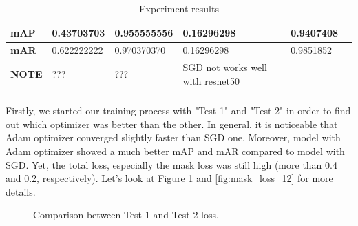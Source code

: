 \begin{longtable}[c]{|p{}|p{}|p{}|p{}|p{}|p{}|}
		\textbf{mAP} & 0.43703703 & 0.955555556 & 0.16296298 & 0.9407408 &  \\ \hline
		\textbf{mAR} & 0.622222222 & 0.970370370 & 0.16296298 & 0.9851852 &  \\ \hline
		\textbf{NOTE} & ??? & ??? & SGD not works well with resnet50 &  &  \\ \hline
	
	\caption{Experiment results}
	\label{table:exp2}
	\end{longtable}
	
	Firstly, we started our training process with "Test 1" and "Test 2" in order to find out which optimizer was better than the other. In general, it is noticeable that Adam optimizer converged slightly faster than SGD one. Moreover, model with Adam optimizer showed a much better mAP and mAR compared to model with SGD. Yet, the total loss, especially the mask loss was still high (more than 0.4 and 0.2, respectively). Let's look at Figure \ref{fig:loss_12} and \ref{fig:mask_loss_12} for more details.
	
	\begin{figure}[H]
		\centering
		\hfill %
		\hfill %
		\caption{Comparison between Test 1 and Test 2 loss.}
		\label{fig:loss_12}
	\end{figure}
	
